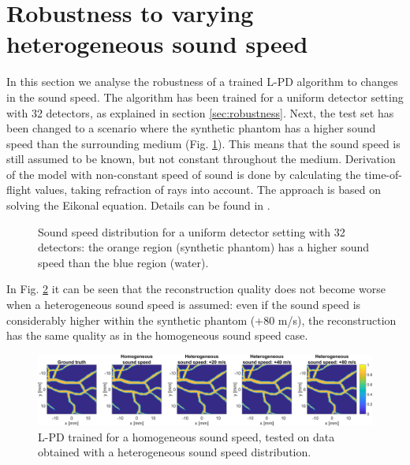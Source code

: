 \documentclass[journal]{IEEEtran}
\begin{document}
{\section{Robustness to varying heterogeneous sound speed}\label{app:SoS}
In this section we analyse the robustness of a trained L-PD algorithm to changes in the sound speed. The algorithm has been trained for a uniform detector setting with 32 detectors, as explained in section \ref{sec:robustness}. Next, the test set has been changed to a scenario where the synthetic phantom has a higher sound speed than the surrounding medium (Fig. \ref{fig:SoS_distribution}). This means that the sound speed is still assumed to be known, but not constant throughout the medium. Derivation of the model with non-constant speed of sound is done by calculating the time-of-flight values, taking refraction of rays into account. The approach is based on solving the Eikonal equation. Details can be found in \cite[section 5.3]{Willemink2010}.

\begin{figure}[ht!]
\centering
\resizebox{0.55\linewidth}{!}{%
\begin{tikzpicture}

\end{tikzpicture}}
\caption{Sound speed distribution for a uniform detector setting with 32 detectors: the orange region (synthetic phantom) has a higher sound speed than the blue region (water).}
\label{fig:SoS_distribution}
\end{figure}

In Fig. \ref{fig:SoS_results} it can be seen that the reconstruction quality does not become worse when a heterogeneous sound speed is assumed: even if the sound speed is considerably higher within the synthetic phantom (+80 m/s), the reconstruction has the same quality as in the homogeneous sound speed case. 

\begin{figure}[ht!]
\centering
\includegraphics[width=\linewidth]{images//heterogeneous_sound_speed.png}
\caption{L-PD trained for a homogeneous sound speed, tested on data obtained with a heterogeneous sound speed distribution.}
\label{fig:SoS_results}
\end{figure}

}
\end{document}
